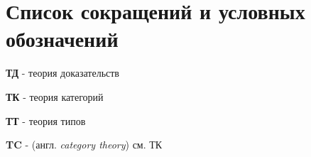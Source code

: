 \chapter*{Список сокращений и условных обозначений}             %

\textbf{ТД} - теория доказательств

\textbf{ТК} - теория категорий

\textbf{ТТ} - теория типов

\textbf{TC} - (англ. \textit{category theory}) см. ТК